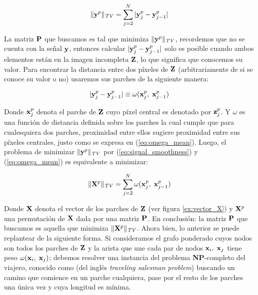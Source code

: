 \begin{equation}
	\|\y^p\|_{\mathit{TV}} = \sum_{j = 2}^{N}|\y_j^{p} - \y_{j - 1}^{p}|
	\label{eq:signal_smoothness}
\end{equation}

La matriz $\P$ que buscamos es tal que minimiza $\|\y^p\|_{\mathit{TV}}$, recordemos que no se cuenta con la señal  $\y$, entonces calcular $|\y_j^{p} - \y_{j - 1}^{p}|$ solo es posible cuando ambos elementos est\'an en la imagen incompleta $\Z$, lo que significa que conocemos su valor. Para encontrar la distancia entre dos p\'ixeles de $\Z$ (arbitrariamente de si se conoce su valor o no) usaremos sus parches de la siguiente manera:

\begin{equation}
	|\y_j^{p} - \y_{j - 1}^{p}| \equiv \omega(\x_j^p,\; \x_{j - 1}^p)
	\label{eq:omega_mean}
\end{equation}

Donde $\x_j^p$ denota el parche de $\Z$ cuyo p\'ixel central es denotado por $\z_j^p$. Y $\omega$ es una funci\'on de distancia definida sobre los parches la cual cumple que para cualesquiera dos parches, proximidad entre ellos sugiere proximidad entre sus p\'ixeles centrales, justo como se expresa en (\ref{eq:omega_mean}). Luego, el problema de minimizar $\|\y^p\|_{\mathit{TV}}$ por (\ref{eq:signal_smoothness}) y (\ref{eq:omega_mean}) es equivalente a minimizar:

\begin{equation}
	\|\X^p\|_{\mathit{TV}} = \sum_{j = 2}^{N}\omega(\x_j^{p},\; \x_{j - 1}^{p})
	\label{eq:path_smoothness}
\end{equation}

Donde $\X$ denota el vector de los parches de $\Z$ (ver figura \ref{ex:vector_X}) y $\X^p$ una permutaci\'on de $\X$ dada por una matriz $\P$. En conclusi\'on: la matriz $\P$ que buscamos es aquella  que minimiza $\|\X^p\|_{\mathit{TV}}$. Ahora bien, lo anterior se puede replantear de la siguiente forma. Si consideramos el grafo ponderado cuyos nodos son todos los parches de $\Z$ y la arista que une cada par de nodos $\x_i,\;\x_j$ tiene peso $\omega(\x_i,\; \x_j)$; debemos resolver una instancia del problema \textbf{NP}-completo del viajero, conocido como \TSP (del ingl\'es \textit{traveling salesman problem}) buscando un camino que comience en un parche cualquiera, pase por el resto de los parches una \'unica vez y cuya longitud es m\'inima.

